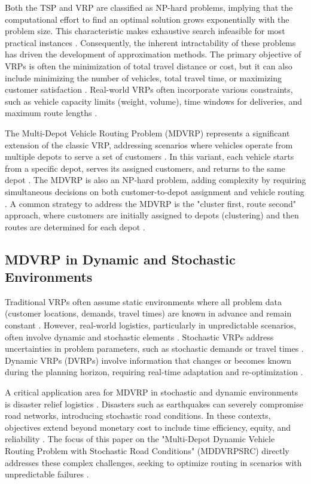 \documentclass[conference]{IEEEtran} %
\begin{document}
Both the TSP and VRP are classified as NP-hard problems, implying that the computational effort to find an optimal solution grows exponentially with the problem size. This characteristic makes exhaustive search infeasible for most practical instances \cite{pelsmaeker2019or}. Consequently, the inherent intractability of these problems has driven the development of approximation methods. The primary objective of VRPs is often the minimization of total travel distance or cost, but it can also include minimizing the number of vehicles, total travel time, or maximizing customer satisfaction \cite{toth2014vehicle}. Real-world VRPs often incorporate various constraints, such as vehicle capacity limits (weight, volume), time windows for deliveries, and maximum route lengths \cite{pelsmaeker2019or}.

The Multi-Depot Vehicle Routing Problem (MDVRP) represents a significant extension of the classic VRP, addressing scenarios where vehicles operate from multiple depots to serve a set of customers \cite{crevier2007vehicle}. In this variant, each vehicle starts from a specific depot, serves its assigned customers, and returns to the same depot \cite{cordeau1997tabu}. The MDVRP is also an NP-hard problem, adding complexity by requiring simultaneous decisions on both customer-to-depot assignment and vehicle routing \cite{cordeau1997tabu}. A common strategy to address the MDVRP is the "cluster first, route second" approach, where customers are initially assigned to depots (clustering) and then routes are determined for each depot \cite{ho2008hybrid}.

\subsection{MDVRP in Dynamic and Stochastic Environments}
Traditional VRPs often assume static environments where all problem data (customer locations, demands, travel times) are known in advance and remain constant \cite{oyola2021recent}. However, real-world logistics, particularly in unpredictable scenarios, often involve dynamic and stochastic elements \cite{gendreau1996stochastic}. Stochastic VRPs address uncertainties in problem parameters, such as stochastic demands or travel times \cite{laporte2002vehicle}. Dynamic VRPs (DVRPs) involve information that changes or becomes known during the planning horizon, requiring real-time adaptation and re-optimization \cite{gendreau1996stochastic}.

A critical application area for MDVRP in stochastic and dynamic environments is disaster relief logistics \cite{yu2020multi}. Disasters such as earthquakes can severely compromise road networks, introducing stochastic road conditions. In these contexts, objectives extend beyond monetary cost to include time efficiency, equity, and reliability \cite{lei2015risk}. The focus of this paper on the "Multi-Depot Dynamic Vehicle Routing Problem with Stochastic Road Conditions" (MDDVRPSRC) directly addresses these complex challenges, seeking to optimize routing in scenarios with unpredictable failures \cite{yu2020multi}.
\end{document}
